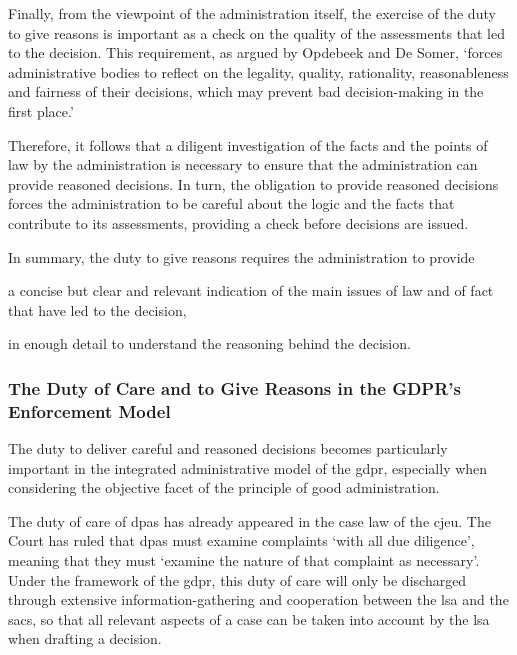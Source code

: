 Finally, from the viewpoint of the administration itself, the exercise of the duty to give reasons is important as a check on the quality of the assessments that led to the decision.\autocites[38]{mustertCrossborderEnforcementGDPR}[370]{craigProcess2018}
This requirement, as argued by Opdebeek and De Somer, `forces administrative bodies to reflect on the legality, quality, rationality, reasonableness and fairness of their decisions, which may prevent bad decision-making in the first place.'\autocite[106]{opdebeekDutyGiveReasons2016}

Therefore, it follows that a diligent investigation of the facts and the points of law by the administration is necessary to ensure that the administration can provide reasoned decisions. 
In turn, the obligation to provide reasoned decisions forces the administration to be careful about the logic and the facts that contribute to its assessments, providing a check before decisions are issued.

In summary, the duty to give reasons requires the administration to provide \begin{enumerate*}[label=(\roman*)]
    \item a concise but clear and relevant indication of the main issues of law and of fact that have led to the decision,
    \item in enough detail to understand the reasoning behind the decision.
\end{enumerate*}

\subsubsection{The Duty of Care and to Give Reasons in the GDPR's Enforcement Model}
\label{sec:ch2-gdpr-enforcement-model}

The duty to deliver careful and reasoned decisions becomes particularly important in the integrated administrative model of the \gls{gdpr}, especially when considering the objective facet of the principle of good administration.\autocite[114]{mihaescu-evansRightGoodAdministration2015}

The duty of care of \glspl{dpa} has already appeared in the case law of the \gls{cjeu}. 
The Court has ruled that \glspl{dpa} must examine complaints `with all due diligence',\autocites[63]{SchremsI}[68]{SCHUFA} meaning that they must `examine the nature of that complaint as necessary'.\autocites[109]{SchremsII}[37]{mustertCrossborderEnforcementGDPR} 
Under the framework of the \gls{gdpr}, this duty of care will only be discharged through extensive information-gathering and cooperation between the \gls{lsa} and the \glspl{sac}, so that all relevant aspects of a case can be taken into account by the \gls{lsa} when drafting a decision.

